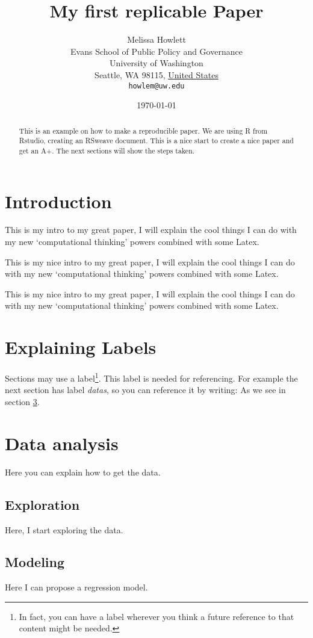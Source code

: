 \documentclass[11pt]{article}
\title{My first replicable Paper}
\author{
        Melissa Howlett\\
        Evans School of Public Policy and Governance\\
        University of Washington\\
        Seattle, WA 98115, \underline{United States}\\
        \texttt{howlem@uw.edu}
}
\date{\today}%
\begin{document}


\maketitle


\begin{abstract}
This is an example on how to make a reproducible paper. We are using R from Rstudio, creating an RSweave document. This is a nice start to create a nice paper and get an A+. The next sections will show the steps taken.
\end{abstract}

\section{Introduction}\label{intro}%
This is my intro to my great paper, I will explain the cool things I can do with my new `computational thinking' powers combined with some Latex.

This is my nice intro to my great paper, 
I will explain the cool things I can do with my new `computational thinking' powers combined with some Latex.



This is my nice intro to my great paper, 
I will explain the cool things 
I can do with my new `computational thinking' 
powers
combined with some Latex.

\section{Explaining Labels}\label{outline}

Sections may use a label\footnote{In fact, you can have a label wherever you think a future reference to that content might be needed.}. This label is needed for referencing. For example the next section has label \emph{datas}, so you can reference it by writing: As we see in section \ref{datas}.

\section{Data analysis}\label{datas}

Here you can explain how to get the data.

\subsection{Exploration}\label{eda}

Here, I start exploring the data. 

\subsection{Modeling}\label{model}

Here I can propose a regression model.
\end{document}
